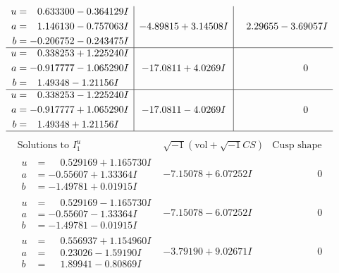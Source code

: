 \documentclass[1p]{elsarticle_modified}
\theoremstyle{definition}
\newcommand{\I}{\sqrt{-1}}
\begin{document}
$$\begin{array}{c|c|c}
\begin{aligned}
u &= \phantom{-}0.633300 - 0.364129 I \\
a &= \phantom{-}1.146130 - 0.757063 I \\
b &= -0.206752 - 0.243475 I\end{aligned}
 & -4.89815 + 3.14508 I & \phantom{-}2.29655 - 3.69057 I \\ \hline\begin{aligned}
u &= \phantom{-}0.338253 + 1.225240 I \\
a &= -0.917777 - 1.065290 I \\
b &= \phantom{-}1.49348 - 1.21156 I\end{aligned}
 & -17.0811 + 4.0269 I & \phantom{-0.000000 } 0 \\ \hline\begin{aligned}
u &= \phantom{-}0.338253 - 1.225240 I \\
a &= -0.917777 + 1.065290 I \\
b &= \phantom{-}1.49348 + 1.21156 I\end{aligned}
 & -17.0811 - 4.0269 I & \phantom{-0.000000 } 0\\
 \hline 
 \end{array}$$\newpage$$\begin{array}{c|c|c}  
\text{Solutions to }I^u_{1}& \I (\text{vol} + \sqrt{-1}CS) & \text{Cusp shape}\\
 \hline 
\begin{aligned}
u &= \phantom{-}0.529169 + 1.165730 I \\
a &= -0.55607 + 1.33364 I \\
b &= -1.49781 + 0.01915 I\end{aligned}
 & -7.15078 + 6.07252 I & \phantom{-0.000000 } 0 \\ \hline\begin{aligned}
u &= \phantom{-}0.529169 - 1.165730 I \\
a &= -0.55607 - 1.33364 I \\
b &= -1.49781 - 0.01915 I\end{aligned}
 & -7.15078 - 6.07252 I & \phantom{-0.000000 } 0 \\ \hline\begin{aligned}
u &= \phantom{-}0.556937 + 1.154960 I \\
a &= \phantom{-}0.23026 - 1.59190 I \\
b &= \phantom{-}1.89941 - 0.80869 I\end{aligned}
 & -3.79190 + 9.02671 I & \phantom{-0.000000 } 0 \\ \hline\begin{aligned}

\end{aligned}
\end{array}$$
\end{document}
